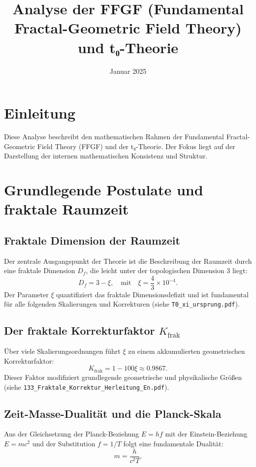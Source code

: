 \documentclass[12pt,a4paper]{article}
\title{Analyse der FFGF (Fundamental Fractal-Geometric Field Theory) und t₀-Theorie}
\author{}
\date{Januar 2025}
\begin{document}
	
	\maketitle
	\section{Einleitung}
	Diese Analyse beschreibt den mathematischen Rahmen der Fundamental Fractal-Geometric Field Theory (FFGF) und der t₀-Theorie. Der Fokus liegt auf der Darstellung der internen mathematischen Konsistenz und Struktur.
	
	\section{Grundlegende Postulate und fraktale Raumzeit}
	\subsection{Fraktale Dimension der Raumzeit}
	Der zentrale Ausgangspunkt der Theorie ist die Beschreibung der Raumzeit durch eine fraktale Dimension \(D_f\), die leicht unter der topologischen Dimension 3 liegt:
	\begin{equation}
		D_f = 3 - \xi, \quad \text{mit} \quad \xi = \frac{4}{3} \times 10^{-4}.
		\label{eq:fractal_dimension}
	\end{equation}
	Der Parameter \(\xi\) quantifiziert das fraktale Dimensionsdefizit und ist fundamental für alle folgenden Skalierungen und Korrekturen 
	(siehe \texttt{T0\_xi\_ursprung.pdf}).
	
	\subsection{Der fraktale Korrekturfaktor \(K_{\text{frak}}\)}
	Über viele Skalierungsordnungen führt \(\xi\) zu einem akkumulierten geometrischen Korrekturfaktor:
	\begin{equation}
		K_{\text{frak}} = 1 - 100\xi \approx 0.9867.
		\label{eq:K_frak}
	\end{equation}
	Dieser Faktor modifiziert grundlegende geometrische und physikalische Größen 
	(siehe \texttt{133\_Fraktale\_Korrektur\_Herleitung\_En.pdf}).
	
	\subsection{Zeit-Masse-Dualität und die Planck-Skala}
	Aus der Gleichsetzung der Planck-Beziehung \(E = hf\) mit der Einstein-Beziehung \(E = mc^2\) und der Substitution \(f = 1/T\) folgt eine fundamentale Dualität:
	\begin{equation}
		m = \frac{h}{c^2 T}.
		\label{eq:time_mass_duality}
	\end{equation}
	\tableofcontents	
\end{document}
